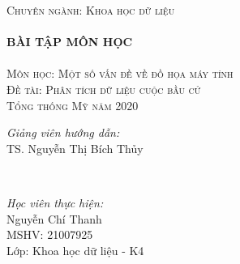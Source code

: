 \documentclass[14pt, a4paper]{article}
\numberwithin{equation}{section}
\numberwithin{figure}{section}
\numberwithin{dl}{section}
\numberwithin{md}{section}
\numberwithin{bd}{section}
\numberwithin{dn}{section}
\numberwithin{hq}{section}
\begin{document}
\begin{titlepage}
        \textsc{\Large Chuyên ngành: Khoa học dữ liệu}\\[0.5cm] %



        \HRule \\[0.4cm]
        { \huge \bfseries BÀI TẬP MÔN HỌC}\\[0.4cm] %
        \HRule \\[1.5cm]

        \textsc{\Large Môn học: Một số vấn đề về đồ họa máy tính}\\[1cm] %


        \textsc{\Large Đề tài: Phân tích dữ liệu cuộc bầu cử \\ Tổng thống Mỹ năm 2020}\\[2cm]


        \begin{minipage}{0.4\textwidth}
            \begin{flushleft} \large
            \emph{Giảng viên hướng dẫn:} \\
            TS. Nguyễn Thị Bích Thủy %
            \end{flushleft}
        \end{minipage}\\[0.5cm]

        \begin{minipage}{0.4\textwidth}
        \begin{flushleft} \large
        \emph{Học viên thực hiện:}\\
        Nguyễn Chí Thanh \\
        MSHV: 21007925 \\ %
        Lớp: Khoa học dữ liệu - K4
        \end{flushleft}
        \end{minipage}




\end{titlepage}
\end{document}
